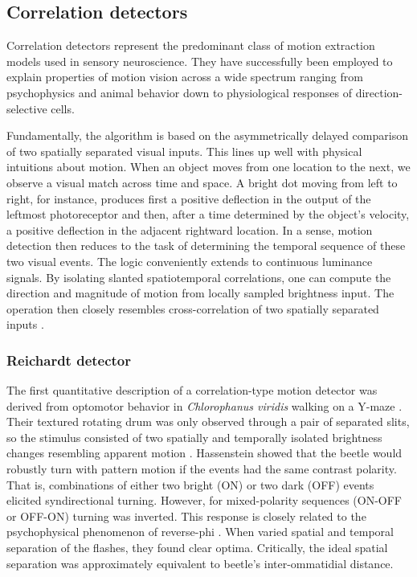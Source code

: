 \subsection{Correlation detectors}

Correlation detectors represent the predominant class of motion extraction models used in sensory neuroscience. They have successfully been employed to explain properties of motion vision across a wide spectrum ranging from psychophysics and animal behavior down to physiological responses of direction-selective cells.

Fundamentally, the algorithm is based on the asymmetrically delayed comparison of two spatially separated visual inputs. This lines up well with physical intuitions about motion. When an object moves from one location to the next, we observe a visual match across time and space. A bright dot moving from left to right, for instance, produces first a positive deflection in the output of the leftmost photoreceptor and then, after a time determined by the object's velocity, a positive deflection in the adjacent rightward location. In a sense, motion detection then reduces to the task of determining the temporal sequence of these two visual events. The logic conveniently extends to continuous luminance signals. By isolating slanted spatiotemporal correlations, one can compute the direction and magnitude of motion from locally sampled brightness input. The operation then closely resembles cross-correlation of two spatially separated inputs \citep{Reichardt:1987uo}.

\subsubsection{Reichardt detector}

The first quantitative description of a correlation-type motion detector was derived from optomotor behavior in \textit{Chlorophanus viridis} walking on a Y-maze \citep{Hassenstein:1951aa}. Their textured rotating drum was only observed through a pair of separated slits, so the stimulus consisted of two spatially and temporally isolated brightness changes resembling apparent motion \citep{Wertheimer:1912aa}. Hassenstein showed that the beetle would robustly turn with pattern motion if the events had the same contrast polarity. That is, combinations of either two bright (ON) or two dark (OFF) events elicited syndirectional turning. However, for mixed-polarity sequences (ON-OFF or OFF-ON) turning was inverted. This response is closely related to the psychophysical phenomenon of reverse-phi \citep{Anstis:1970tv,Anstis:1975tu}. When \citet{Hassenstein:1956fa} varied spatial and temporal separation of the flashes, they found clear optima. Critically, the ideal spatial separation was approximately equivalent to beetle's inter-ommatidial distance.

